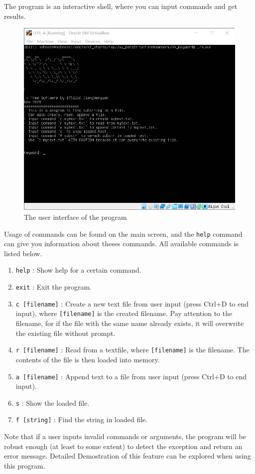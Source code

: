 \documentclass[cn,black,12pt,normal]{elegantnote}
\begin{document}
The program is an interactive shell, where you can input commands and get results.

\begin{figure}[H]
    \centering
    \includegraphics[width=0.6\linewidth]{image/kmp_01.jpg}
    \caption{The user interface of the program}
\end{figure}

Usage of commands can be found on the main screen, and the \lstinline{help} command can give you information about theses commands.  All available commands is listed below.

\begin{enumerate}
    \item \lstinline{help} : Show help for a certain command.
    \item \lstinline{exit} : Exit the program.
    \item \lstinline{c [filename]} : Create a new text file from user input (press Ctrl+D to end input), where \lstinline{[filename]} is the created filename. Pay attention to the filename, for if the file with the same name already exists, it will overwrite the existing file without prompt.
    \item \lstinline{r [filename]} : Read from a textfile, where \lstinline{[filename]} is the filename. The contents of the file is then loaded into memory.
    \item \lstinline{a [filename]} : Append text to a file from user input (press Ctrl+D to end input).
    \item \lstinline{s} : Show the loaded file.
    \item \lstinline{f [string]} : Find the string in loaded file.
\end{enumerate}
Note that if a user inputs invalid commands or arguments, the program will be robust enough (at least to some extent) to detect the exception and return an error message. Detailed Demostration of this feature can be explored when using this program.
\end{document}

